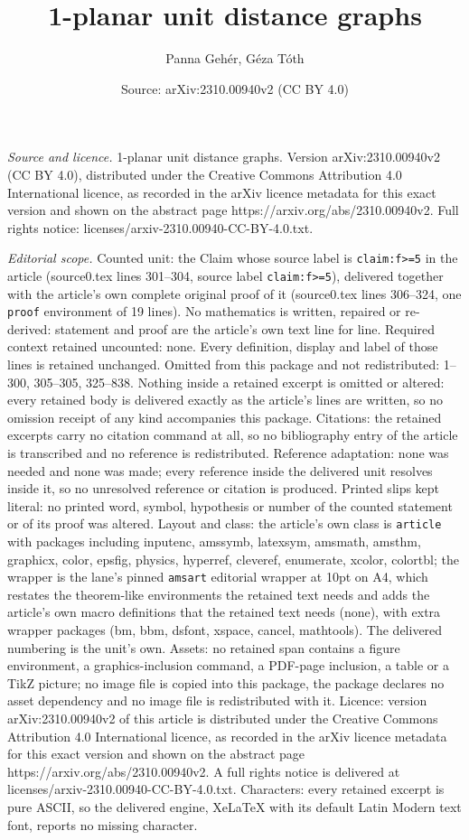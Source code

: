 \documentclass[10pt,a4paper]{amsart}
\title[1-planar unit distance graphs]{1-planar unit distance graphs}
\author{Panna Geh\'er, G\'eza T\'oth}
\date{Source: arXiv:2310.00940v2 (CC BY 4.0)}
\begin{document}
\maketitle

\noindent\emph{Source and licence.} 1-planar unit distance graphs. Version arXiv:2310.00940v2 (CC BY 4.0), distributed under the Creative Commons Attribution 4.0 International licence, as recorded in the arXiv licence metadata for this exact version and shown on the abstract page https://arxiv.org/abs/2310.00940v2. Full rights notice: licenses/arxiv-2310.00940-CC-BY-4.0.txt.\par\smallskip

\noindent\textit{Editorial scope.} Counted unit: the Claim whose source label is \texttt{claim:f>=5} in the article (source0.tex lines 301--304, source label \texttt{claim:f>=5}), delivered together with the article's own complete original proof of it (source0.tex lines 306--324, one \texttt{proof} environment of 19 lines). No mathematics is written, repaired or re-derived: statement and proof are the article's own text line for line. Required context retained uncounted: none. Every definition, display and label of those lines is retained unchanged. Omitted from this package and not redistributed: 1--300, 305--305, 325--838. Nothing inside a retained excerpt is omitted or altered: every retained body is delivered exactly as the article's lines are written, so no omission receipt of any kind accompanies this package. Citations: the retained excerpts carry no citation command at all, so no bibliography entry of the article is transcribed and no reference is redistributed. Reference adaptation: none was needed and none was made; every reference inside the delivered unit resolves inside it, so no unresolved reference or citation is produced. Printed slips kept literal: no printed word, symbol, hypothesis or number of the counted statement or of its proof was altered. Layout and class: the article's own class is \texttt{article} with packages including inputenc, amssymb, latexsym, amsmath, amsthm, graphicx, color, epsfig, physics, hyperref, cleveref, enumerate, xcolor, colortbl; the wrapper is the lane's pinned \texttt{amsart} editorial wrapper at 10pt on A4, which restates the theorem-like environments the retained text needs and adds the article's own macro definitions that the retained text needs (none), with extra wrapper packages (bm, bbm, dsfont, xspace, cancel, mathtools). The delivered numbering is the unit's own. Assets: no retained span contains a figure environment, a graphics-inclusion command, a PDF-page inclusion, a table or a TikZ picture; no image file is copied into this package, the package declares no asset dependency and no image file is redistributed with it. Licence: version arXiv:2310.00940v2 of this article is distributed under the Creative Commons Attribution 4.0 International licence, as recorded in the arXiv licence metadata for this exact version and shown on the abstract page https://arxiv.org/abs/2310.00940v2. A full rights notice is delivered at licenses/arxiv-2310.00940-CC-BY-4.0.txt. Characters: every retained excerpt is pure ASCII, so the delivered engine, XeLaTeX with its default Latin Modern text font, reports no missing character.
\end{document}

